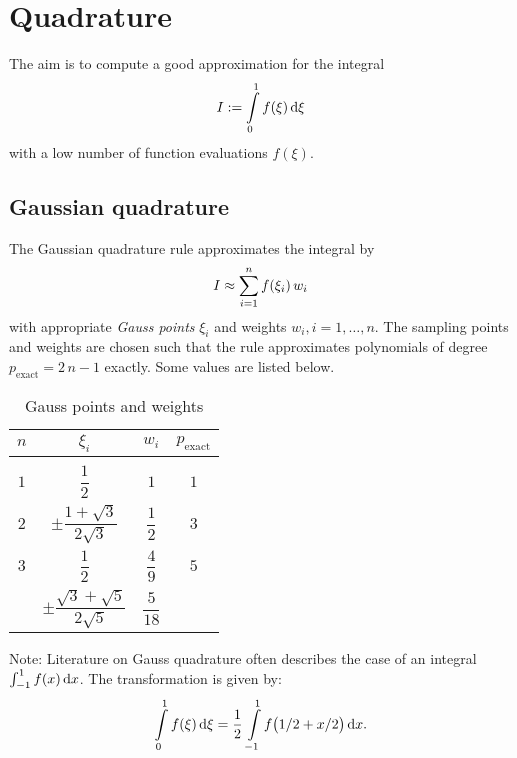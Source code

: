 \section{Quadrature}

The aim is to compute a good approximation for the integral
%
\begin{equation*}
  \begin{array}{lll}
    I := \i{0}{1}f(\xi)\,\d \xi
  \end{array}
\end{equation*}
with a low number of function evaluations $f(\xi)$. 
\subsection{Gaussian quadrature}
The Gaussian quadrature rule approximates the integral by
%
\begin{equation*}
  \begin{array}{lll}
    I \approx \displaystyle\sum\limits_{i=1}^{n}f(\xi_i)\,w_i
  \end{array}
\end{equation*}
with appropriate \emph{Gauss points} $\xi_i$ and weights $w_i, i=1,\dots,n$. The sampling points and weights are chosen such that the rule approximates polynomials of degree $p_\text{exact}=2\,n-1$ exactly. Some values are listed below. 

\begin{table}[ht]
\centering
\begin{tabular}{c|c|c|c}
    $n$& $\xi_i$& $w_i$ & $p_\text{exact}$\\[4mm]
    \hline&&\\[-4mm]
    $1$& $\dfrac12$ & $1$ & $1$\\[4mm]
    \hline
    $2$& $\pm \dfrac{1+\sqrt{3}}{2\sqrt{3}}$ & $\dfrac12$ & $3$\\[4mm]
    \hline
    $3$& $\dfrac12$ & $\dfrac49$ & $5$ \\[4mm]
     & $\pm \dfrac{\sqrt{3}+\sqrt{5}}{2\sqrt{5}}$ & $\dfrac{5}{18}$ &
\end{tabular}
\caption{Gauss points and weights}
\end{table}

Note: Literature on Gauss quadrature often describes the case of an integral $\int_{-1}^{1} f(x) \,\d x$. The transformation is given by:
%
\begin{equation*}
  \begin{array}{lll}
    \i{0}{1} f(\xi) \,\d \xi = \dfrac12 \i{-1}{1} f\big(1/2+x/2\big) \,\d x.
  \end{array}
\end{equation*}


